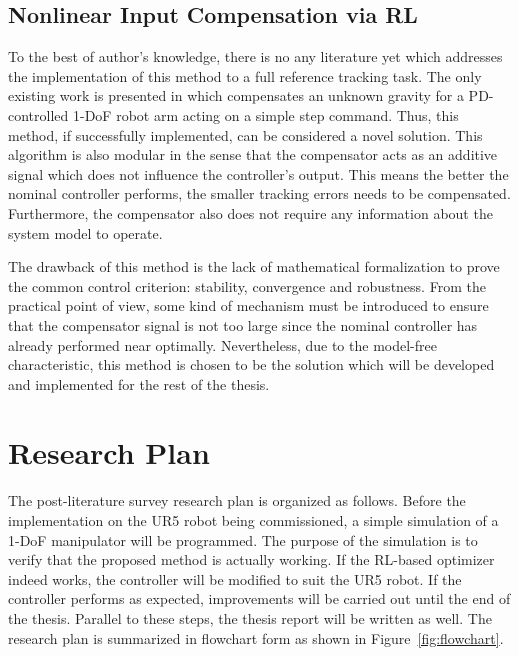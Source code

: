 \subsection{Nonlinear Input Compensation via \ac{RL}}
To the best of author's knowledge, there is no any literature yet which addresses the implementation of this method to a full reference tracking task. The only existing work is presented in \cite{Efe2014} which compensates an unknown gravity for a \ac {PD}-controlled 1-\ac {DoF} robot arm acting on a simple step command. Thus, this method, if successfully implemented, can be considered a novel solution. This algorithm is also modular in the sense that the compensator acts as an additive signal which does not influence the controller's output. This means the better the nominal controller performs, the smaller tracking errors needs to be compensated. Furthermore, the compensator also does not require any information about the system model to operate. 

The drawback of this method is the lack of mathematical formalization to prove the common control criterion: stability, convergence and robustness. From the practical point of view, some kind of mechanism must be introduced to ensure that the compensator signal is not too large since the nominal controller has already performed near optimally. Nevertheless, due to the model-free characteristic, this method is chosen to be the solution which will be developed and implemented for the rest of the thesis.

\section{Research Plan} \label{sec:res_planning}
The post-literature survey research plan is organized as follows. Before the implementation on the UR5 robot being commissioned, a simple simulation of a 1-\ac {DoF} manipulator will be programmed. The purpose of the simulation is to verify that the proposed method is actually working. If the \ac{RL}-based optimizer indeed works, the controller will be modified to suit the UR5 robot. If the controller performs as expected, improvements will be carried out until the end of the thesis. Parallel to these steps, the thesis report will be written as well. The research plan is summarized in flowchart form as shown in Figure~\ref{fig:flowchart}.

